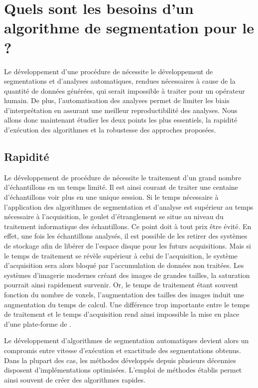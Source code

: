 \documentclass[\main/main.tex]{subfiles}
\begin{document}
            
\section{Quels sont les besoins d'un algorithme de segmentation pour le \hcs{}?}

%
Le développement d'une procédure de \hcs{} nécessite le développement de segmentations et d'analyses automatiques, rendues nécessaires à cause de la quantité de données générées, qui serait impossible à traiter pour un opérateur humain.
%
De plus, l'automatisation des analyses permet de limiter les biais d'interprétation en assurant une meilleur reproductibilité des analyses.
%
Nous allons donc maintenant étudier les deux points les plus essentiels,
la rapidité d'exécution des algorithmes et la robustesse des approches proposées.

    \subsection{Rapidité}
    
%
Le développement de procédure de \hcs{} nécessite le traitement d'un grand nombre d'échantillons en un temps limité.
%
Il est ainsi courant de traiter une centaine d'échantillons voir plus en une unique session.
%
Si le temps nécessaire à l'application des algorithmes de segmentation et d'analyse est supérieur au temps nécessaire à l'acquisition,
le goulet d'étranglement se situe au niveau du traitement informatique des échantillons.
%
Ce point doit à tout prix être évité. En effet, une fois les échantillons analysés, il est possible de les retirer des systèmes de stockage afin de libérer de l'espace disque pour les futurs acquisitions. Mais si le temps de traitement se révèle supérieur à celui de l'acquisition, le système d'acquisition sera alors bloqué par l'accumulation de données non traitées.
%
Les systèmes d'imagerie modernes créant des images de grandes tailles, la saturation pourrait ainsi rapidement survenir.
%
Or, le temps de traitement étant souvent fonction du nombre de voxels, l'augmentation des tailles des images induit une augmentation du temps de calcul.
%
Une différence trop importante entre le temps de traitement et le temps d'acquisition rend ainsi impossible la mise en place d'une plate-forme de \hcs{}.

%
Le développement d'algorithmes de segmentation automatiques devient alors un compromis entre vitesse d'exécution et exactitude des segmentations obtenus.
%
Dans la plupart des cas, les méthodes développés depuis plusieurs décennies disposent d'implémentations optimisées\cite{vandroogenbroeck_1996,perreault_2007,trieu_2007}.
%
L'emploi de méthodes établis permet ainsi souvent de créer des algorithmes rapides.
\end{document}

